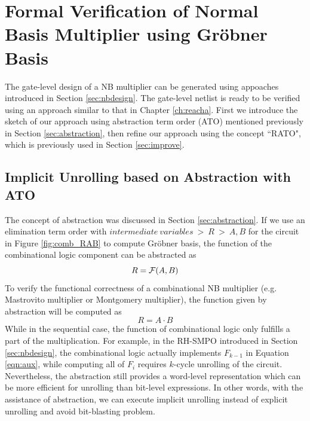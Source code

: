\section{Formal Verification of Normal Basis Multiplier using Gr\"obner Basis}
The gate-level design of a NB multiplier can be generated using appoaches introduced in 
Section \ref{sec:nbdesign}. The gate-level netlist is ready to be verified using 
an approach similar to that in Chapter \ref{ch:reacha}. 
First we introduce the sketch of our approach using abstraction term order (ATO)
mentioned previously in Section \ref{sec:abstraction}, then refine our approach using 
the concept ``RATO", which is previously used in Section \ref{sec:improve}.
\subsection{Implicit Unrolling based on Abstraction with ATO}
\begin{figure}[H]
\end{figure}

The concept of abstraction was discussed in Section \ref{sec:abstraction}. If we use an elimination term order with
$intermediate~variables~>~R~>~A,B$ for the circuit in Figure \ref{fig:comb_RAB} to compute Gr\"obner basis, 
the function of the combinational logic component can be abstracted as 
$$R = {\mathcal{F}}(A,B)$$
To verify the functional correctness of a combinational NB multiplier (e.g. Mastrovito multiplier
or Montgomery multiplier), the function given by abstraction will be computed as
$$R=A\cdot B$$
While in the sequential case, the function of combinational logic only fulfills a part of the multiplication.
For example, in the RH-SMPO introduced in Section \ref{sec:nbdesign}, 
the combinational logic actually implements  $F_{k-1}$ in Equation \ref{eqn:aux},
while computing all of $F_i$ requires $k$-cycle unrolling of the circuit.
Nevertheless, the abstraction still provides a word-level 
representation which can be more efficient for unrolling than bit-level expressions.
In other words, with the assistance of abstraction, we can execute implicit unrolling instead of 
explicit unrolling and avoid bit-blasting problem.

